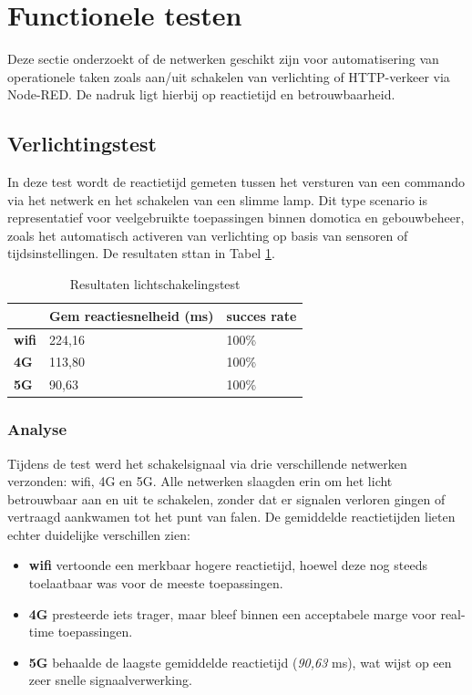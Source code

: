 \newpage
\section{Functionele testen}

Deze sectie onderzoekt of de netwerken geschikt zijn voor automatisering van operationele taken zoals aan/uit schakelen van verlichting of HTTP-verkeer via Node-RED. De nadruk ligt hierbij op reactietijd en betrouwbaarheid.

\subsection{Verlichtingstest}

In deze test wordt de reactietijd gemeten tussen het versturen van een commando via het netwerk en het schakelen van een slimme lamp. Dit type scenario is representatief voor veelgebruikte toepassingen binnen domotica en gebouwbeheer, zoals het automatisch activeren van verlichting op basis van sensoren of tijdsinstellingen. De resultaten sttan in Tabel \ref{tab:licht}.

\begin{table}[]
    \caption{Resultaten lichtschakelingstest}
    \begin{tabular}{l l l}
        \cline{2-3}
        & \textbf{Gem reactiesnelheid (ms)} & \textbf{succes rate} \\ \hline
        \multicolumn{1}{l}{\textbf{wifi}} & 224,16                            & 100\%                \\ \hline
        \multicolumn{1}{l}{\textbf{4G}}   & 113,80                             & 100\%                \\ \hline
        \multicolumn{1}{l}{\textbf{5G}}   & 90,63                             & 100\%                \\ \hline
    \end{tabular}
    \label{tab:licht}
\end{table}

\subsubsection{Analyse}
Tijdens de test werd het schakelsignaal via drie verschillende netwerken verzonden: wifi, 4G en 5G. Alle netwerken slaagden erin om het licht betrouwbaar aan en uit te schakelen, zonder dat er signalen verloren gingen of vertraagd aankwamen tot het punt van falen. De gemiddelde reactietijden lieten echter duidelijke verschillen zien:
\begin{itemize}
    \item \textbf{wifi} vertoonde een merkbaar hogere reactietijd, hoewel deze nog steeds toelaatbaar was voor de meeste toepassingen.
    \item \textbf{4G} presteerde iets trager, maar bleef binnen een acceptabele marge voor real-time toepassingen.
    \item \textbf{5G} behaalde de laagste gemiddelde reactietijd (\textit{90,63} ms), wat wijst op een zeer snelle signaalverwerking.
\end{itemize}

